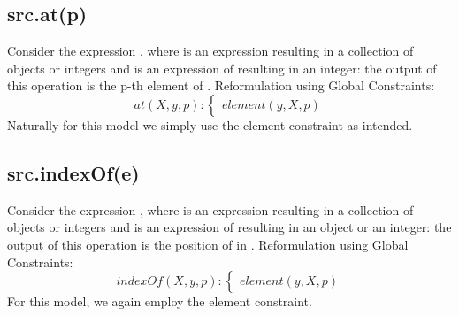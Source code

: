\newpage\subsection{src.at(p)}
Consider the expression , where  is an expression resulting in a collection of objects or integers and  is an expression of resulting in an integer: the output of this operation is the p-th element of . 
Reformulation using Global Constraints:
\begin{equation}\label{csp:at}
    at(X,y,p):
    \begin{cases}
        element(y,X,p)
    \end{cases}
\end{equation}
Naturally for this model we simply use the element constraint as intended.

\subsection{src.indexOf(e)}
Consider the expression , where  is an expression resulting in a collection of objects or integers and  is an expression of resulting in an object or an integer: the output of this operation is the position of  in .
Reformulation using Global Constraints:
\begin{equation}\label{csp:indexOf}
    indexOf(X,y,p):
    \begin{cases}
        element(y,X,p)
    \end{cases}
\end{equation}
For this model, we again employ the element constraint.

